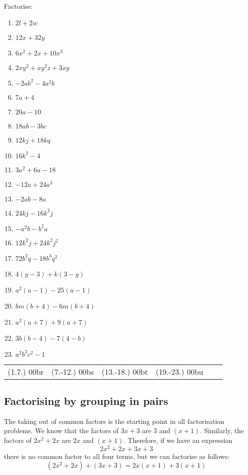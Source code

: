 \begin{exercises}{}{Factorise:
\begin{multicols}{2}
\begin{enumerate}[itemsep=5pt, label=\textbf{\arabic*}. ] 
\item $2l+2w$
\item $12x+32y$
\item $6{x}^{2}+2x+10{x}^{3}$
\item $2x{y}^{2}+x{y}^{2}z+3xy$
\item $-2a{b}^{2}-4{a}^{2}b$
\item $7a+4$ 
\item $20a-10$ 
\item $18ab-3bc$
\item $12kj+18kq$ 
\item $16{k}^{2}-4$ 
\item $3{a}^{2}+6a-18$
\item $-12a+24a^3$ 
\item $-2ab-8a$ 
\item $24kj-16{k}^{2}j$
\item $-{a}^{2}b-{b}^{2}a$ 
\item $12{k}^{2}j+24{k}^{2}{j}^{2}$ 
\item $72{b}^{2}q-18{b}^{3}{q}^{2}$
\item $4(y-3)+k(3-y)$ 
\item $a^2(a-1)-25(a-1)$ 
\item $bm(b+4)-6m(b+4)$
\item ${a}^{2}(a+7)+9(a+7)$ 
\item $3b(b-4)-7(4-b)$ 
\item ${a}^{2}{b}^{2}{c}^{2}-1$
\end{enumerate}
\end{multicols}
\practiceinfo 
\par 
 \par \begin{tabular}[h]{cccccc}
 (1.7.) 00br&  (7.-12.) 00bs& (13.-18.) 00bt&  (19.-23.) 00bu\end{tabular}
}
\end{exercises}

\subsection{Factorising by grouping in pairs}

The taking out of common factors is the starting point in all
factorisation problems. We know that the factors of $3x+3$ are $3$
and $(x+1)$. Similarly, the factors of $2{x}^{2}+2x$ are $2x$ and
$(x+1)$. Therefore, if we have an expression
\begin{equation*}
2{x}^{2}+2x+3x+3
\end{equation*}
there is no common factor to all four terms, but we can factorise as
follows:
\begin{equation*}
  (2{x}^{2}+2x)+(3x+3) = 2x(x+1)+3(x+1)
\end{equation*}

